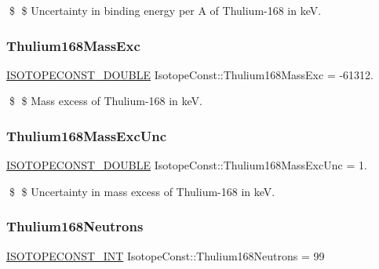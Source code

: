 \$ \$ Uncertainty in binding energy per A of Thulium-\/168 in keV. \mbox{\label{group___isotope_const-_thulium-_tm168_ga745098a6810c1213a83bd892459c9b00}} 
\subsubsection{\texorpdfstring{Thulium168\+Mass\+Exc}{Thulium168MassExc}}
{\footnotesize\ttfamily \mbox{\hyperlink{group___isotope_const-_macros_ga8f45a7272ce02c0b4c65c44636ed719a}{I\+S\+O\+T\+O\+P\+E\+C\+O\+N\+S\+T\+\_\+\+D\+O\+U\+B\+LE}} Isotope\+Const\+::\+Thulium168\+Mass\+Exc = -\/61312.}

\$ \$ Mass excess of Thulium-\/168 in keV. \mbox{\label{group___isotope_const-_thulium-_tm168_gac2d93e25b54685275104f9dd5c050c6e}} 
\subsubsection{\texorpdfstring{Thulium168\+Mass\+Exc\+Unc}{Thulium168MassExcUnc}}
{\footnotesize\ttfamily \mbox{\hyperlink{group___isotope_const-_macros_ga8f45a7272ce02c0b4c65c44636ed719a}{I\+S\+O\+T\+O\+P\+E\+C\+O\+N\+S\+T\+\_\+\+D\+O\+U\+B\+LE}} Isotope\+Const\+::\+Thulium168\+Mass\+Exc\+Unc = 1.}

\$ \$ Uncertainty in mass excess of Thulium-\/168 in keV. \mbox{\label{group___isotope_const-_thulium-_tm168_ga32f616d14a432f9cbba7de4f7cce6c15}} 
\subsubsection{\texorpdfstring{Thulium168\+Neutrons}{Thulium168Neutrons}}
{\footnotesize\ttfamily \mbox{\hyperlink{group___isotope_const-_macros_ga5f18360b3e99483a35c32d789e62621c}{I\+S\+O\+T\+O\+P\+E\+C\+O\+N\+S\+T\+\_\+\+I\+NT}} Isotope\+Const\+::\+Thulium168\+Neutrons = 99}

